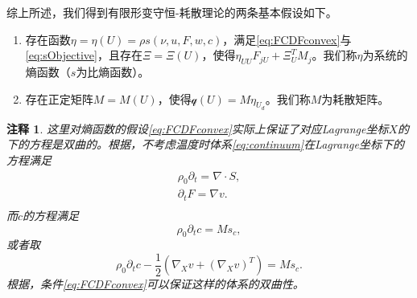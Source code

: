 \documentclass{article}
\newtheorem{remark}{注释}
\begin{document}
综上所述，我们得到有限形变守恒-耗散理论的两条基本假设如下。
\begin{enumerate}
		\item 存在函数$\eta = \eta (U) = \rho s(\nu,u,F,w,c)$，满足\eqref{eq:FCDFconvex}与\eqref{eq:sObjective}，且存在$\Xi=\Xi(U)$，使得$\eta_{UU} F_{jU} + \Xi_U^T M_j $。我们称$\eta$为系统的熵函数（$s$为比熵函数）。
		\item 存在正定矩阵$M = M(U)$，使得$\mathcal{q}(U) = M \eta_{U_d}$。我们称$M$为耗散矩阵。
\end{enumerate}
\begin{remark}
这里对熵函数的假设\eqref{eq:FCDFconvex}实际上保证了对应Lagrange坐标$X$的下的方程是双曲的。根据\cite{dafermos2010hyperbolic}，不考虑温度时体系\eqref{eq:continuum}在Lagrange坐标下的方程满足
\begin{subequations}
\begin{align*}
	\rho_0 \partial_t = \nabla \cdot S, \\
	\partial_t F = \nabla v.\\
\end{align*}
\end{subequations}
而$c$的方程满足
\begin{equation*}
	\rho_0 \partial_t c = M s_c,
\end{equation*}
或者取
\begin{equation*}
	\rho_0 \partial_t c - \frac{1}{2} (\nabla_X v + (\nabla_X v)^T)= M s_c.
\end{equation*}
根据\cite{dafermos2010hyperbolic}，条件\eqref{eq:FCDFconvex}可以保证这样的体系的双曲性。
\end{remark}
\end{document}
